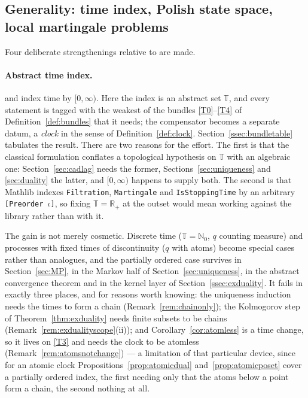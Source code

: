 \documentclass[11pt,a4paper]{article}
\theoremstyle{plain}
\theoremstyle{definition}
\theoremstyle{remark}
\newcommand{\R}{\mathbb{R}}
\newcommand{\N}{\mathbb{N}}
\newcommand{\Rp}{\R_+}
\newcommand{\T}{\mathbb{T}}                     %
\newcommand{\EK}{\cite{EK86}}
\newcommand{\CPS}{\cite{CPS23}}
\begin{document}
\subsection{Generality: time index, Polish state space, local martingale problems}

Four deliberate strengthenings relative to \EK{} are made.

\paragraph{Abstract time index.}
\EK{} and \CPS{} index time by $[0,\infty)$.  Here the index is an abstract set
$\T$, and every statement is tagged with the weakest of the bundles
\eqref{T0}--\eqref{T4} of Definition~\ref{def:bundles} that it needs; the compensator
becomes a separate datum, a \emph{clock} in the sense of
Definition~\ref{def:clock}.  Section~\ref{ssec:bundletable} tabulates the result.
There are two reasons for the effort.  The first is that the classical
formulation conflates a topological hypothesis on $\T$ with an algebraic one:
Section~\ref{sec:cadlag} needs the former, Sections~\ref{sec:uniqueness} and
\ref{sec:duality} the latter, and $[0,\infty)$ happens to supply both.  The
second is that Mathlib indexes \texttt{Filtration}, \texttt{Martingale} and
\texttt{IsStoppingTime} by an arbitrary \texttt{[Preorder \(\iota\)]}, so fixing
$\T = \Rp$ at the outset would mean working against the library rather than with
it.

The gain is not merely cosmetic.  Discrete time ($\T = \N_0$, $q$ counting
measure) and processes with fixed times of discontinuity ($q$ with atoms) become
special cases rather than analogues, and the partially ordered case survives in
Section~\ref{sec:MP}, in the Markov half of Section~\ref{sec:uniqueness}, in the
abstract convergence theorem and in the kernel layer of
Section~\ref{ssec:exduality}.  It fails in exactly three places, and for
reasons worth knowing: the uniqueness induction needs the times to form a chain
(Remark~\ref{rem:chainonly}); the Kolmogorov step of
Theorem~\ref{thm:exduality} needs finite subsets to be chains
(Remark~\ref{rem:exdualityscope}(ii)); and Corollary~\ref{cor:atomless} is a
time change, so it lives on \eqref{T3} and needs the clock to be atomless
(Remark~\ref{rem:atomsnotchange}) --- a limitation of that particular device,
since for an atomic clock Propositions~\ref{prop:atomicdual}
and~\ref{prop:atomicposet} cover a partially ordered index, the first needing
only that the atoms below a point form a chain, the second nothing at all.
\end{document}
